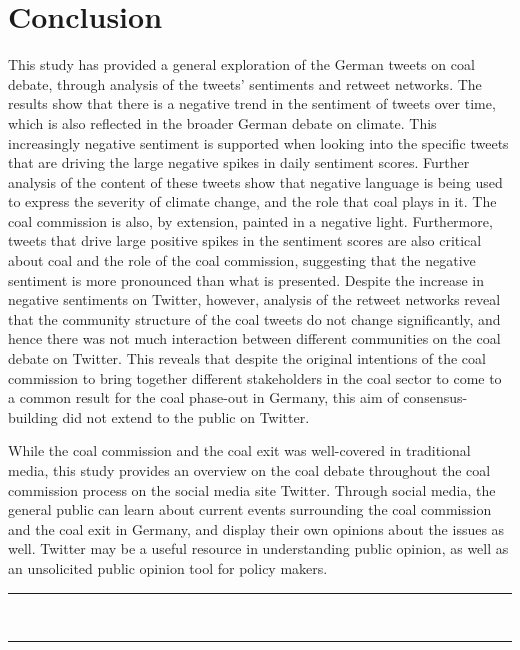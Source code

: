 \documentclass[12pt,onecolumn,twoside]{layout}
\begin{document}
\section{Conclusion} \label{sec:conclusion}
This study has provided a general exploration of the German tweets on coal debate, through analysis of the tweets' sentiments and retweet networks. The results show that there is a negative trend in the sentiment of tweets over time, which is also reflected in the broader German debate on climate. This increasingly negative sentiment is supported when looking into the specific tweets that are driving the large negative spikes in daily sentiment scores. Further analysis of the content of these tweets show that negative language is being used to express the severity of climate change, and the role that coal plays in it. The coal commission is also, by extension, painted in a negative light. Furthermore, tweets that drive large positive spikes in the sentiment scores are also critical about coal and the role of the coal commission, suggesting that the negative sentiment is more pronounced than what is presented. Despite the increase in negative sentiments on Twitter, however, analysis of the retweet networks reveal that the community structure of the coal tweets do not change significantly, and hence there was not much interaction between different communities on the coal debate on Twitter. This reveals that despite the original intentions of the coal commission to bring together different stakeholders in the coal sector to come to a common result for the coal phase-out in Germany, this aim of consensus-building did not extend to the public on Twitter.

While the coal commission and the coal exit was well-covered in traditional media, this study provides an overview on the coal debate throughout the coal commission process on the social media site Twitter. Through social media, the general public can learn about current events surrounding the coal commission and the coal exit in Germany, and display their own opinions about the issues as well. Twitter may be a useful resource in understanding public opinion, as well as an unsolicited public opinion tool for policy makers.


\vfill
\rule{0.33\linewidth}{0pt}\\[-3.7ex] \rule{0.33\linewidth}{0.6pt}
\end{document}
